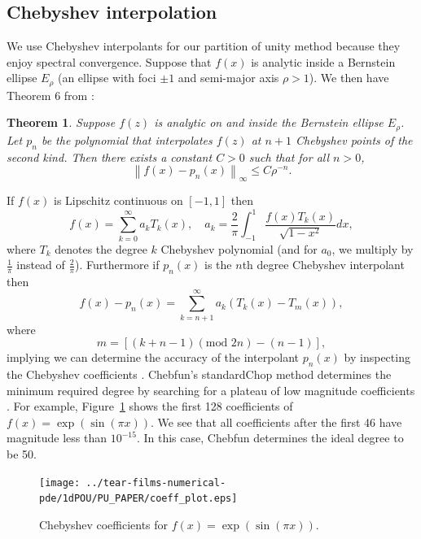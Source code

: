 \documentclass{article}
\newtheorem{theorem}{Theorem}[section]
\newcommand{\lp}{\left(}
\newcommand{\rp}{\right)}
\begin{document}
\subsection{Chebyshev interpolation}
\label{sec_cheb}
We use Chebyshev interpolants for our partition of unity method because they enjoy spectral convergence. Suppose that $f(x)$ is analytic inside a  Bernstein ellipse $E_\rho$ (an ellipse with foci $\pm 1$ and semi-major axis $\rho>1$). We then have Theorem 6 from \cite{trefethen2000spectral}:
\begin{theorem} Suppose $f(z)$ is analytic on and inside the Bernstein ellipse $E_\rho$. Let $p_n$ be the polynomial that interpolates $f(z)$ at $n+1$ Chebyshev points of the second kind. Then there exists a constant $C>0$ such that for all $n>0$,
$$ \left \| f(x)-p_n(x) \right \|_{\infty} \leq C  \rho^{-n}.$$
 \end{theorem}
If $f(x)$ is Lipschitz continuous on $[-1,1]$ then
\begin{equation}
f(x) = \sum_{k=0}^\infty a_k T_k(x), \quad a_k = \frac{2}{\pi} \int_{-1}^1 \frac{f(x) T_k(x)}{\sqrt{1-x^2}} dx,
\end{equation}
where $T_k$ denotes the degree $k$ Chebyshev polynomial (and for $a_0$, we multiply by $\frac{1}{\pi}$ instead of $\frac{2}{\pi}$). Furthermore if $p_n(x)$ is the $n$th degree Chebyshev interpolant then
\begin{equation}
f(x)-p_n(x) = \sum_{k=n+1}^{\infty} a_k \lp T_k(x)-T_m(x)\rp,
\end{equation}
where
\begin{equation}
m = \left [ (k+n-1)(\text{mod }2n) - (n-1)\right ],
\end{equation}
implying we can determine the accuracy of the interpolant $p_n(x)$ by inspecting the Chebyshev coefficients \cite{Trefethen2013}. Chebfun's standardChop method determines the minimum required degree by searching for a plateau of low magnitude coefficients \cite{Aurentz:2017:CCS:3034774.2998442}.  For example, Figure~\ref{Coeff_example} shows the first 128 coefficients of $f(x)=\exp \lp \sin \lp \pi x \rp \rp$. We see that all coefficients after the first 46 have magnitude less than $10^{-15}$. In this case, Chebfun determines the ideal degree to be 50.
\begin{figure}[!htb]
\centering
\texttt{[image: ../tear-films-numerical-pde/1dPOU/PU\_PAPER/coeff\_plot.eps]}
\caption{Chebyshev coefficients for $f(x)=\exp \lp \sin \lp \pi x \rp \rp$.}
\label{Coeff_example}
\end{figure}
\end{document}
